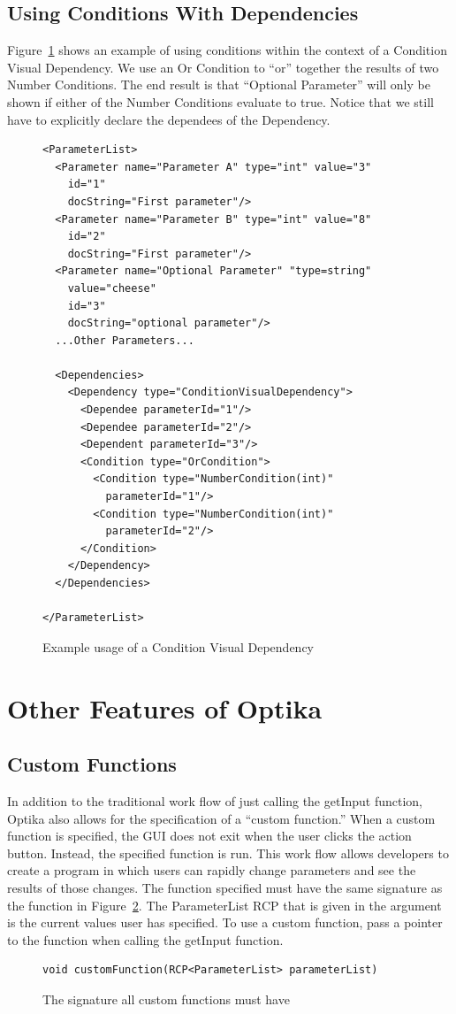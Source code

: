 \subsection{Using Conditions With Dependencies}
Figure~\ref{conVisDep} shows an example of using conditions within the context of a Condition Visual Dependency.
We use an Or Condition to ``or'' together the results of two Number Conditions. The end result is that ``Optional Parameter'' 
will only be shown if either of the Number Conditions evaluate to true. Notice that we still have to explicitly declare
the dependees of the Dependency.
\begin{figure}
\centering
{\footnotesize
\begin{Verbatim}
<ParameterList>
  <Parameter name="Parameter A" type="int" value="3"
    id="1"
    docString="First parameter"/>
  <Parameter name="Parameter B" type="int" value="8"
    id="2"
    docString="First parameter"/>
  <Parameter name="Optional Parameter" "type=string"
    value="cheese"
    id="3"
    docString="optional parameter"/>
  ...Other Parameters...

  <Dependencies>
    <Dependency type="ConditionVisualDependency">
      <Dependee parameterId="1"/>
      <Dependee parameterId="2"/>
      <Dependent parameterId="3"/>
      <Condition type="OrCondition">
        <Condition type="NumberCondition(int)" 
          parameterId="1"/>
        <Condition type="NumberCondition(int)"
          parameterId="2"/>
      </Condition>
    </Dependency>
  </Dependencies>

</ParameterList>
\end{Verbatim}
}
\caption{Example usage of a Condition Visual Dependency}
\label{conVisDep}
\end{figure}

\section{Other Features of Optika}
\subsection{Custom Functions}
In addition to the traditional work flow of just calling the getInput function, Optika also allows for the specification of a 
``custom function.''
When a custom function is specified, the GUI does not exit when the user clicks the action button. Instead, the specified function is run. 
This work flow allows developers 
to create a program in which users can rapidly change parameters and see the results of those changes. The function specified must have 
the same signature as the function 
in Figure~\ref{custSig}. The ParameterList RCP that is given in the argument is the current values user has specified. To use a custom 
function, pass a pointer to the function when calling the getInput function.
\begin{figure}
\centering
{\footnotesize
\begin{Verbatim}
void customFunction(RCP<ParameterList> parameterList)
\end{Verbatim}
}
\caption{The signature all custom functions must have}
\label{custSig}
\end{figure}

